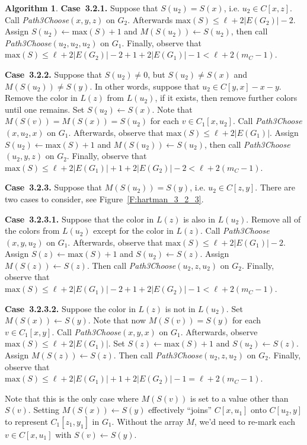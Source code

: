 \documentclass[12pt,letterpaper]{article}
\theoremstyle{plain}
\theoremstyle{definition}
\theoremstyle{break}
\newtheorem{algorithm}[lemma]{Algorithm}     %
\begin{document}
\begin{algorithm}
\textbf{Case~3.2.1.} Suppose that $S(u_2)=S(x)$, i.e. $u_2\in C[x,z]$.
Call \emph{Path3Choose}$(x, y, z)$ on $G_2$.
Afterwards $\text{max}(S)\le\ell + 2|E(G_2)|-2$.
Assign $S(u_2)\leftarrow\text{max}(S)+1$ and
$M(S(u_2))\leftarrow S(u_2)$, then call
\emph{Path3Choose}$(u_2, u_2, u_2)$ on $G_1$.
Finally, observe that
$\text{max}(S)\le\ell + 2|E(G_2)|-2 + 1 + 2|E(G_1)|-1<\ell+2(m_C-1)$.

\textbf{Case~3.2.2.} Suppose that $S(u_2)\ne 0$, but
$S(u_2)\ne S(x)$ and $M(S(u_2))\ne S(y)$. In other words, suppose that
$u_2\in C[y,x]-x-y$.
Remove the color in $L(z)$ from $L(u_2)$, if it exists, then remove
further colors until one remains. Set $S(u_2)\leftarrow S(x)$.
Note that $M(S(v))=M(S(x))=S(u_2)$ for each $v\in C_1[x,u_2]$.
Call \emph{Path3Choose}$(x, u_2, x)$ on $G_1$.
Afterwards, observe that $\text{max}(S)\le\ell +2|E(G_1)|$.
Assign $S(u_2)\leftarrow\text{max}(S)+1$ and
$M(S(u_2))\leftarrow S(u_2)$, then
call \emph{Path3Choose}$(u_2, y, z)$
on $G_2$.
Finally, observe that
$\text{max}(S)\le\ell + 2|E(G_1)| + 1 + 2|E(G_2)|-2<\ell+2(m_C-1)$.

\textbf{Case~3.2.3.} Suppose that $M(S(u_2))=S(y)$, i.e.
$u_2\in C[z,y]$. There are
two cases to consider, see Figure~\ref{F:hartman_3_2_3}.

\textbf{Case~3.2.3.1.} Suppose that the color in $L(z)$ is also in
$L(u_2)$. Remove
all of the colors from $L(u_2)$ except for the color in $L(z)$.
Call \emph{Path3Choose}$(x, y, u_2)$ on $G_1$.
Afterwards, observe that $\text{max}(S)\le\ell + 2|E(G_1)|-2$.
Assign
$S(z)\leftarrow\text{max}(S)+1$ and $S(u_2)\leftarrow S(z)$. Assign
$M(S(z))\leftarrow S(z)$. Then call
\emph{Path3Choose}$(u_2, z, u_2)$ on $G_2$. Finally, observe that
$\text{max}(S)\le\ell + 2|E(G_1)|-2 + 1 + 2|E(G_2)| - 1<\ell+2(m_C-1)$.

\textbf{Case~3.2.3.2.} Suppose the color in $L(z)$ is not in $L(u_2)$.
Set $M(S(x))\leftarrow S(y)$. Note that now $M(S(v))=S(y)$ for each
$v\in C_1[x,y]$. Call \emph{Path3Choose}$(x, y, x)$ on
$G_1$. Afterwards, observe $\text{max}(S)\le\ell + 2|E(G_1)|$.
Set $S(z)\leftarrow\text{max}(S)+1$ and $S(u_2)\leftarrow S(z)$. Assign
$M(S(z))\leftarrow S(z)$. Then call \emph{Path3Choose}$(u_2, z, u_2)$ on
$G_2$. Finally, observe that
$\text{max}(S)\le\ell + 2|E(G_1)| + 1 + 2|E(G_2)| - 1=\ell+2(m_C-1)$.

Note that this is the only case where
$M(S(v))$ is set to a value other than $S(v)$.
Setting $M(S(x))\leftarrow S(y)$ effectively ``joins''
$C[x,u_1]$ onto $C[u_2,y]$ to represent $C_1[z_1,y_1]$ in $G_1$.
Without the array $M$, we'd need to re-mark each $v\in C[x,u_1]$ with
$S(v)\leftarrow S(y)$.
\end{algorithm}
\end{document}
